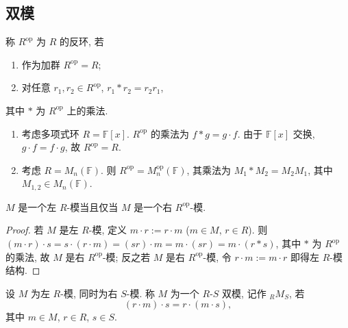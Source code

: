 \subsection{双模}

\begin{definition}[反环]\label{def:opposite-ring}
称 $R^{\mathrm{op}}$ 为 $R$ 的反环, 若
\begin{enumerate}
  \item 作为加群 $R^{\mathrm{op}}=R$;
  \item 对任意 $r_1,r_2\in R^{\mathrm{op}}$, $r_1*r_2=r_2r_1$,
\end{enumerate}
其中 $*$ 为 $R^{\mathrm{op}}$ 上的乘法.
\end{definition}

\begin{example}\label{ex:opposite-algebra}
\mbox{}\par\vspace{-0.2em}
\begin{enumerate}
  \item 考虑多项式环 $R=\mathbb{F}[x]$. $R^{\mathrm{op}}$ 的乘法为 $f*g=g\cdot f$.
  由于 $\mathbb{F}[x]$ 交换, $g\cdot f=f\cdot g$, 故 $R^{\mathrm{op}}=R$.
  \item 考虑 $R=M_n(\mathbb{F})$. 则 $R^{\mathrm{op}}=M_n^{\mathrm{op}}(\mathbb{F})$, 其乘法为
  $M_1*M_2=M_2M_1$, 其中 $M_{1,2}\in M_n(\mathbb{F})$.
\end{enumerate}
\end{example}

\begin{proposition}\label{prop:left-right-module}
$M$ 是一个左 $R$-模当且仅当 $M$ 是一个右 $R^{\mathrm{op}}$-模.
\end{proposition}

\begin{proof}
若 $M$ 是左 $R$-模, 定义 $m\cdot r:=r\cdot m$ ($m\in M$, $r\in R$). 则
$(m\cdot r)\cdot s=s\cdot(r\cdot m)=(sr)\cdot m=m\cdot(sr)=m\cdot(r*s)$, 其中 $*$ 为 $R^{\mathrm{op}}$ 的乘法,
故 $M$ 是右 $R^{\mathrm{op}}$-模; 反之若 $M$ 是右 $R^{\mathrm{op}}$-模, 令 $r\cdot m:=m\cdot r$ 即得左 $R$-模结构.
\end{proof}

\begin{definition}[双模]\label{def:bimodule}
设 $M$ 为左 $R$-模, 同时为右 $S$-模. 称 $M$ 为一个 $R$-$S$ 双模, 记作 ${}_RM_S$, 若
\[
  (r\cdot m)\cdot s=r\cdot(m\cdot s),
\]
其中 $m\in M$, $r\in R$, $s\in S$.
\end{definition}

